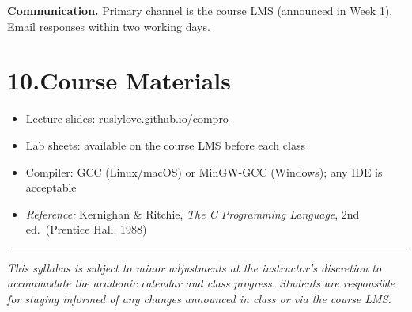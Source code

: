 \documentclass[11pt,a4paper]{article}
\begin{document}
\medskip
\noindent\textbf{Communication.}
Primary channel is the course LMS (announced in Week 1).
Email responses within two working days.

\section*{10.\quad Course Materials}
\begin{itemize}
  \item Lecture slides: \href{https://ruslylove.github.io/compro}{ruslylove.github.io/compro}
  \item Lab sheets: available on the course LMS before each class
  \item Compiler: GCC (Linux/macOS) or MinGW-GCC (Windows); any IDE is acceptable
  \item \textit{Reference:} Kernighan \& Ritchie,
        \textit{The C Programming Language}, 2nd ed.\ (Prentice Hall, 1988)
\end{itemize}

\vfill
\noindent\rule{\linewidth}{0.4pt}
\begin{center}
  \small\textit{This syllabus is subject to minor adjustments at the
  instructor's discretion to accommodate the academic calendar and class
  progress. Students are responsible for staying informed of any changes
  announced in class or via the course LMS.}
\end{center}
\end{document}
